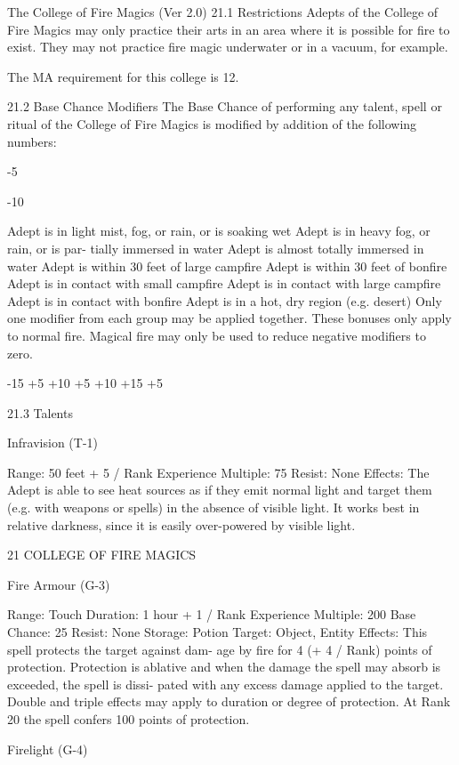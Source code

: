 \begin{Chapter}{The College of Fire Magics (Ver 2.0)}
21.1 Restrictions 
Adepts  of  the  College  of  Fire  Magics  may  only 
practice their arts in an area where it is possible for 
fire  to  exist.  They  may  not  practice  fire  magic 
underwater or in a vacuum, for example. 

The MA requirement for this college is 12. 

21.2 Base Chance Modifiers 
The Base Chance of performing any talent, spell or 
ritual of the College of Fire Magics is modified by 
addition of the following numbers: 

-5 

-10 

Adept is in light mist, fog, or rain, or is 
soaking wet 
Adept is in heavy fog, or rain, or is par-
tially immersed in water 
Adept is almost totally immersed in water 
Adept is within 30 feet of large campfire 
Adept is within 30 feet of bonfire 
Adept is in contact with small campfire 
Adept is in contact with large campfire 
Adept is in contact with bonfire 
Adept is in a hot, dry region (e.g. desert) 
Only one modifier from each group may be applied 
together. These bonuses only apply to normal fire. 
Magical  fire  may  only  be  used  to  reduce  negative 
modifiers to zero. 

-15 
+5 
+10 
+5 
+10 
+15 
+5 

21.3 Talents 

Infravision (T-1) 

Range: 50 feet + 5 / Rank 
Experience Multiple: 75 
Resist: None 
Effects: The Adept is able to see heat sources as if 
they  emit  normal  light  and  target  them  (e.g.  with 
weapons or spells) in the absence of visible light. It 
works  best  in  relative  darkness,  since  it  is  easily 
over-powered by visible light. 

21 COLLEGE OF FIRE MAGICS 

Fire Armour (G-3) 

Range: Touch 
Duration: 1 hour + 1 / Rank 
Experience Multiple: 200 
Base Chance: 25%
Resist: None 
Storage: Potion 
Target: Object, Entity 
Effects:  This  spell  protects  the  target  against dam-
age by fire for 4 (+ 4 / Rank) points of  protection. 
Protection  is  ablative  and  when  the  damage  the 
spell  may  absorb  is  exceeded,  the  spell  is  dissi-
pated with any excess damage applied to the target. 
Double and triple effects may apply to duration or 
degree  of  protection.  At Rank  20  the  spell  confers 
100 points of protection. 

Firelight (G-4) 


\end{Chapter}
